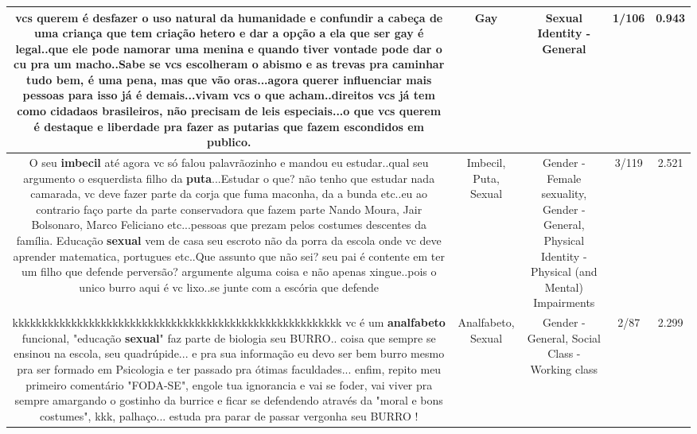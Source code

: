 \documentclass[11pt]{article}
\newlength\mylength
\begin{document}
\begin{center}
\begin{longtable}{|C{.65\mylength}|C{.30\mylength}|C{.12\mylength}|C{.12\mylength}|C{.12\mylength}|}
  \small vcs querem é desfazer o uso natural da humanidade e confundir a cabeça de uma criança que tem criação hetero e dar a opção a ela que ser \textbf{gay} é legal..que ele pode namorar uma menina e quando tiver vontade pode dar o cu pra um macho..Sabe se vcs escolheram o abismo e as trevas pra caminhar tudo bem, é uma pena, mas que vão oras...agora querer influenciar mais pessoas para isso já é demais...vivam vcs o que acham..direitos vcs já tem como  cidadaos brasileiros, não precisam de leis especiais...o que vcs querem é destaque e liberdade pra fazer as putarias que fazem escondidos em publico.\normalsize   & Gay & Sexual Identity - General & 1/106 & 0.943 \\  \hline
  \small O seu \textbf{imbecil} até agora vc só falou palavrãozinho e mandou eu estudar..qual seu argumento o esquerdista filho da \textbf{puta}...Estudar o que? não tenho que estudar nada camarada, vc deve fazer parte da corja que fuma maconha, da a bunda etc..eu ao contrario faço parte da parte conservadora que fazem parte Nando Moura, Jair Bolsonaro, Marco Feliciano etc...pessoas que prezam pelos costumes descentes da família. Educação \textbf{sexual} vem de casa seu escroto não da porra da escola onde vc deve aprender matematica, portugues etc..Que assunto que não sei? seu pai é contente em ter um filho que defende perversão? argumente alguma coisa e não apenas xingue..pois o unico burro aqui é vc lixo..se junte com a escória que defende\normalsize   & Imbecil, Puta, Sexual & Gender - Female sexuality, Gender - General, Physical Identity - Physical (and Mental) Impairments & 3/119 & 2.521 \\  \hline
  \small kkkkkkkkkkkkkkkkkkkkkkkkkkkkkkkkkkkkkkkkkkkkkkkkkkkkkkkk vc é um \textbf{analfabeto} funcional, "educação \textbf{sexual}" faz parte de biologia seu BURRO.. coisa que sempre se ensinou na escola, seu quadrúpide... e pra sua informação eu devo ser bem burro mesmo pra ser formado em Psicologia e ter passado pra ótimas faculdades... enfim, repito meu primeiro comentário "FODA-SE", engole tua ignorancia e vai se foder, vai viver pra sempre amargando o gostinho da burrice e ficar se defendendo através da "moral e bons costumes", kkk, palhaço... estuda pra parar de passar vergonha seu BURRO !\normalsize   & Analfabeto, Sexual & Gender - General, Social Class - Working class & 2/87 & 2.299 \\  \hline

\end{longtable}
\end{center}
\end{document}
